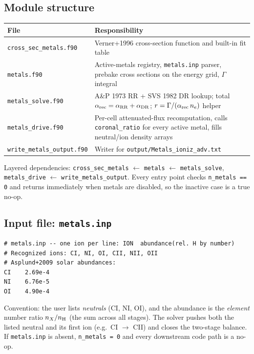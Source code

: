 \documentclass[english,a4paper]{kiseon_memo}
\begin{document}
\subsection{Module structure}

\begin{center}
\begin{tabular}{|l|p{8.5cm}|}
\hline
File & Responsibility \\
\hline
\texttt{cross\_sec\_metals.f90}
   & Verner+1996 cross-section function and built-in fit table \\
\texttt{metals.f90}
   & Active-metals registry, \texttt{metals.inp} parser, prebake
     cross sections on the energy grid, $\Gamma$ integral \\
\texttt{metals\_solve.f90}
   & A\&P 1973 RR + SVS 1982 DR lookup; total
     $\alpha_{\rm rec} = \alpha_{\rm RR} + \alpha_{\rm DR}$;
     $r = \Gamma / (\alpha_{\rm rec}\,n_e)$ helper \\
\texttt{metals\_drive.f90}
   & Per-cell attenuated-flux recomputation, calls
     \texttt{coronal\_ratio} for every active metal, fills neutral/ion
     density arrays \\
\texttt{write\_metals\_output.f90}
   & Writer for \texttt{output/Metals\_ioniz\_adv.txt} \\
\hline
\end{tabular}
\end{center}

Layered dependencies: \texttt{cross\_sec\_metals} $\leftarrow$
\texttt{metals} $\leftarrow$ \texttt{metals\_solve},
\texttt{metals\_drive} $\leftarrow$ \texttt{write\_metals\_output}. Every
entry point checks \texttt{n\_metals == 0} and returns immediately when
metals are disabled, so the inactive case is a true no-op.

\subsection{Input file: \texttt{metals.inp}}

\begin{verbatim}
# metals.inp -- one ion per line: ION  abundance(rel. H by number)
# Recognized ions: CI, NI, OI, CII, NII, OII
# Asplund+2009 solar abundances:
CI    2.69e-4
NI    6.76e-5
OI    4.90e-4
\end{verbatim}

Convention: the user lists \emph{neutrals} (CI, NI, OI), and the abundance
is the \emph{element} number ratio $n_X / n_{\rm H}$ (the sum across all
stages). The solver pushes both the listed neutral and its first ion
(e.g.\ CI $\to$ CII) and closes the two-stage balance. If
\texttt{metals.inp} is absent, \texttt{n\_metals = 0} and every downstream
code path is a no-op.
\end{document}
